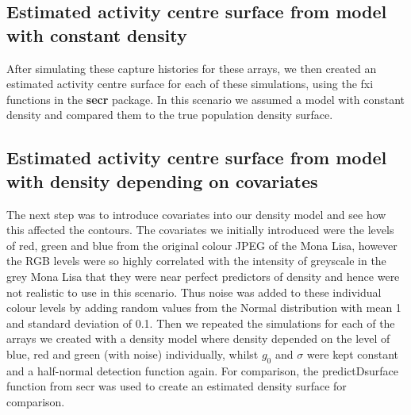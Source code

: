 \documentclass[a4paper,12pt]{article}
\begin{document}
\subsection{Estimated activity centre surface from model with constant density}
After simulating these capture histories for these arrays, we then created an estimated activity centre surface for each of these simulations, using the fxi functions in the \textbf{secr} package. In this scenario we assumed a model with constant density and compared them to the true population density surface.

\subsection{Estimated activity centre surface from model with density depending on covariates}
The next step was to introduce covariates into our density model and see how this affected the contours. The covariates we initially introduced were the levels of red, green and blue from the original colour JPEG of the Mona Lisa, however the RGB levels were so highly correlated with the intensity of greyscale in the grey Mona Lisa that they were near perfect predictors of density and hence were not realistic to use in this scenario. Thus noise was added to these individual colour levels by adding random values from the Normal distribution with mean 1 and standard deviation of 0.1. Then we repeated the simulations for each of the arrays we created with a density model where density depended on the level of blue, red and green (with noise) individually, whilst $g_0$ and $\sigma$ were kept constant and a half-normal detection function again. For comparison, the predictDsurface function from secr was used to create an estimated density surface for comparison.
\end{document}
